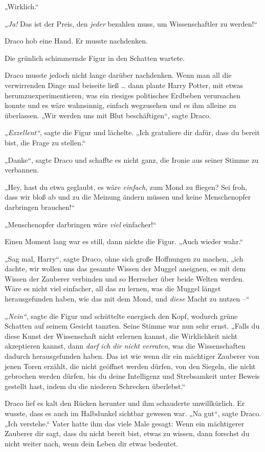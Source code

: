 „Wirklich.“ 

„\emph{Ja!} Das ist der Preis, den \emph{jeder} bezahlen muss, um Wissenschaftler zu werden!“ 

Draco hob eine Hand. Er musste nachdenken. 

Die grünlich schimmernde Figur in den Schatten wartete. 

Draco musste jedoch nicht lange darüber nachdenken. Wenn man all die verwirrenden Dinge mal beiseite ließ … dann plante Harry Potter, mit etwas herumzuexperimentieren, was ein riesiges politisches Erdbeben verursachen konnte und es wäre wahnsinnig, einfach wegzusehen und es ihm alleine zu überlassen. „Wir werden uns mit Blut beschäftigen“, sagte Draco. 

\emph{„Exzellent“}, sagte die Figur und lächelte. „Ich gratuliere dir dafür, dass du bereit bist, die Frage zu stellen.“ 

„Danke“, sagte Draco und schaffte es nicht ganz, die Ironie aus seiner Stimme zu verbannen. 

„Hey, hast du etwa geglaubt, es wäre \emph{einfach}, zum Mond zu fliegen? Sei froh, dass wir bloß ab und zu die Meinung ändern müssen und keine Menschenopfer darbringen brauchen!“ 

„Menschenopfer darbringen wäre \emph{viel} einfacher!“ 

Einen Moment lang war es still, dann nickte die Figur. „Auch wieder wahr.“ 

„Sag mal, Harry“, sagte Draco, ohne sich große Hoffnungen zu machen, „ich dachte, wir wollen uns das gesamte Wissen der Muggel aneignen, es mit dem Wissen der Zauberer verbinden und so Herrscher über beide Welten werden. Wäre es nicht viel einfacher, all das zu lernen, was die Muggel längst herausgefunden haben, wie das mit dem Mond, und \emph{diese} Macht zu nutzen –“ 

\emph{„Nein“}, sagte die Figur und schüttelte energisch den Kopf, wodurch grüne Schatten auf seinem Gesicht tanzten. Seine Stimme war nun sehr ernst. „Falls du diese Kunst der Wissenschaft nicht erlernen kannst, die Wirklichkeit nicht akzeptieren kannst, dann \emph{darf ich dir nicht verraten}, was die Wissenschaften dadurch herausgefunden haben. Das ist wie wenn dir ein mächtiger Zauberer von jenen Toren erzählt, die nicht geöffnet werden dürfen, von den Siegeln, die nicht gebrochen werden dürfen, bis du deine Intelligenz und Strebsamkeit unter Beweis gestellt hast, indem du die niederen Schrecken überlebst.“ 

Draco lief es kalt den Rücken herunter und ihm schauderte unwillkürlich. Er wusste, dass es auch im Halbdunkel sichtbar gewesen war. „Na gut“, sagte Draco. „Ich verstehe.“ Vater hatte ihm das viele Male gesagt: Wenn ein mächtigerer Zauberer dir sagt, dass du nicht bereit bist, etwas zu wissen, dann forschst du nicht weiter nach, wenn dein Leben dir etwas bedeutet. 

